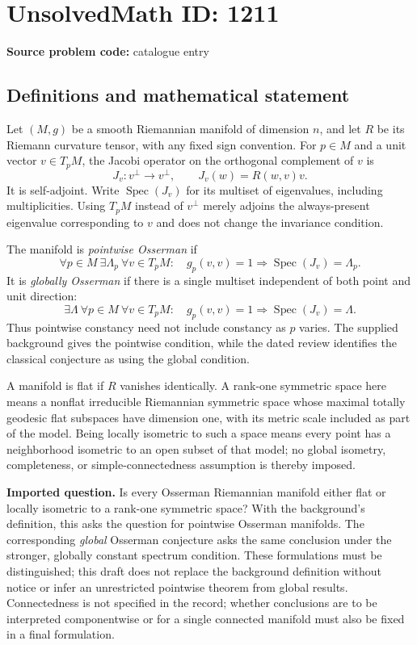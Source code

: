 \documentclass[11pt]{article}
\begin{document}
\section*{UnsolvedMath ID: 1211}
\textbf{Source problem code:} catalogue entry
\subsection{Definitions and mathematical statement}
Let $(M,g)$ be a smooth Riemannian manifold of dimension $n$, and let $R$ be its Riemann curvature tensor, with any fixed sign convention. For $p\in M$ and a unit vector $v\in T_pM$, the Jacobi operator on the orthogonal complement of $v$ is
\[
 J_v:v^\perp\longrightarrow v^\perp,\qquad J_v(w)=R(w,v)v.
\]
It is self-adjoint. Write $\operatorname{Spec}(J_v)$ for its multiset of eigenvalues, including multiplicities. Using $T_pM$ instead of $v^\perp$ merely adjoins the always-present eigenvalue corresponding to $v$ and does not change the invariance condition.

The manifold is \emph{pointwise Osserman} if
\[
 \forall p\in M\ \exists\Lambda_p\ \forall v\in T_pM:
 \quad g_p(v,v)=1\Longrightarrow\operatorname{Spec}(J_v)=\Lambda_p.
\]
It is \emph{globally Osserman} if there is a single multiset independent of both point and unit direction:
\[
 \exists\Lambda\ \forall p\in M\ \forall v\in T_pM:
 \quad g_p(v,v)=1\Longrightarrow\operatorname{Spec}(J_v)=\Lambda.
\]
Thus pointwise constancy need not include constancy as $p$ varies. The supplied background gives the pointwise condition, while the dated review identifies the classical conjecture as using the global condition.

A manifold is flat if $R$ vanishes identically. A rank-one symmetric space here means a nonflat irreducible Riemannian symmetric space whose maximal totally geodesic flat subspaces have dimension one, with its metric scale included as part of the model. Being locally isometric to such a space means every point has a neighborhood isometric to an open subset of that model; no global isometry, completeness, or simple-connectedness assumption is thereby imposed.

\textbf{Imported question.} Is every Osserman Riemannian manifold either flat or locally isometric to a rank-one symmetric space? With the background's definition, this asks the question for pointwise Osserman manifolds. The corresponding \emph{global} Osserman conjecture asks the same conclusion under the stronger, globally constant spectrum condition. These formulations must be distinguished; this draft does not replace the background definition without notice or infer an unrestricted pointwise theorem from global results. Connectedness is not specified in the record; whether conclusions are to be interpreted componentwise or for a single connected manifold must also be fixed in a final formulation.
\end{document}
